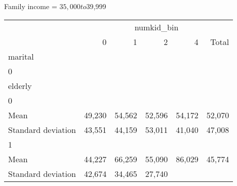 Family income = $35,000 to $39,999
\begin{tabular}{llllll}
\cline{1-6}
\multicolumn{1}{c}{} &
  \multicolumn{5}{|c}{numkid\_bin} \\
\multicolumn{1}{c}{} &
  \multicolumn{1}{|r}{0} &
  \multicolumn{1}{r}{1} &
  \multicolumn{1}{r}{2} &
  \multicolumn{1}{r}{4} &
  \multicolumn{1}{r}{Total} \\
\cline{1-6}
\multicolumn{1}{l}{marital} &
  \multicolumn{1}{|r}{} &
  \multicolumn{1}{r}{} &
  \multicolumn{1}{r}{} &
  \multicolumn{1}{r}{} &
  \multicolumn{1}{r}{} \\
\multicolumn{1}{l}{\hspace{1em}0} &
  \multicolumn{1}{|r}{} &
  \multicolumn{1}{r}{} &
  \multicolumn{1}{r}{} &
  \multicolumn{1}{r}{} &
  \multicolumn{1}{r}{} \\
\multicolumn{1}{l}{\hspace{2em}elderly} &
  \multicolumn{1}{|r}{} &
  \multicolumn{1}{r}{} &
  \multicolumn{1}{r}{} &
  \multicolumn{1}{r}{} &
  \multicolumn{1}{r}{} \\
\multicolumn{1}{l}{\hspace{3em}0} &
  \multicolumn{1}{|r}{} &
  \multicolumn{1}{r}{} &
  \multicolumn{1}{r}{} &
  \multicolumn{1}{r}{} &
  \multicolumn{1}{r}{} \\
\multicolumn{1}{l}{\hspace{4em}Mean} &
  \multicolumn{1}{|r}{49,230} &
  \multicolumn{1}{r}{54,562} &
  \multicolumn{1}{r}{52,596} &
  \multicolumn{1}{r}{54,172} &
  \multicolumn{1}{r}{52,070} \\
\multicolumn{1}{l}{\hspace{4em}Standard deviation} &
  \multicolumn{1}{|r}{43,551} &
  \multicolumn{1}{r}{44,159} &
  \multicolumn{1}{r}{53,011} &
  \multicolumn{1}{r}{41,040} &
  \multicolumn{1}{r}{47,008} \\
\multicolumn{1}{l}{\hspace{3em}1} &
  \multicolumn{1}{|r}{} &
  \multicolumn{1}{r}{} &
  \multicolumn{1}{r}{} &
  \multicolumn{1}{r}{} &
  \multicolumn{1}{r}{} \\
\multicolumn{1}{l}{\hspace{4em}Mean} &
  \multicolumn{1}{|r}{44,227} &
  \multicolumn{1}{r}{66,259} &
  \multicolumn{1}{r}{55,090} &
  \multicolumn{1}{r}{86,029} &
  \multicolumn{1}{r}{45,774} \\
\multicolumn{1}{l}{\hspace{4em}Standard deviation} &
  \multicolumn{1}{|r}{42,674} &
  \multicolumn{1}{r}{34,465} &
  \multicolumn{1}{r}{27,740} &

\end{tabular}
